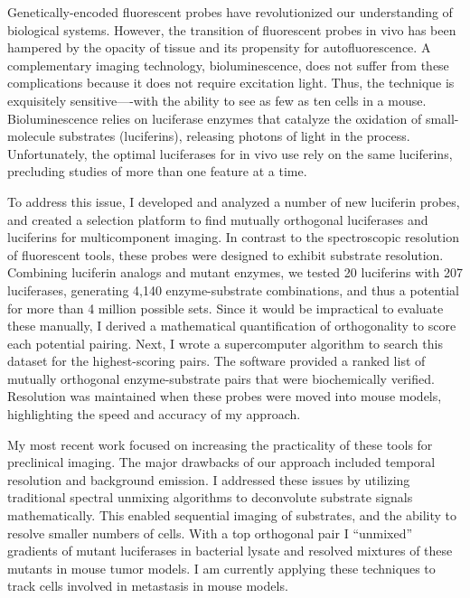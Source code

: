 \thesisabstract
{
Genetically-encoded fluorescent probes have revolutionized our understanding of biological systems. However, the transition of fluorescent probes in vivo has been hampered by the opacity of tissue and its propensity for autofluorescence. A complementary imaging technology, bioluminescence, does not suffer from these complications because it does not require excitation light. Thus, the technique is exquisitely sensitive—-with the ability to see as few as ten cells in a mouse. Bioluminescence relies on luciferase enzymes that catalyze the oxidation of small-molecule substrates (luciferins), releasing photons of light in the process. Unfortunately, the optimal luciferases for in vivo use rely on the same luciferins, precluding studies of more than one feature at a time.

To address this issue, I developed and analyzed a number of new luciferin probes, and created a selection platform to find mutually orthogonal luciferases and luciferins for multicomponent imaging. In contrast to the spectroscopic resolution of fluorescent tools, these probes were designed to exhibit substrate resolution. Combining luciferin analogs and mutant enzymes, we tested 20 luciferins with 207 luciferases, generating 4,140 enzyme-substrate combinations, and thus a potential for more than 4 million possible sets. Since it would be impractical to evaluate these manually, I derived a mathematical quantification of orthogonality to score each potential pairing. Next, I wrote a supercomputer algorithm to search this dataset for the highest-scoring pairs. The software provided a ranked list of mutually orthogonal enzyme-substrate pairs that were biochemically verified. Resolution was maintained when these probes were moved into mouse models, highlighting the speed and accuracy of my approach.

My most recent work focused on increasing the practicality of these tools for preclinical imaging. The major drawbacks of our approach included temporal resolution and background emission. I addressed these issues by utilizing traditional spectral unmixing algorithms to deconvolute substrate signals mathematically. This enabled sequential imaging of substrates, and the ability to resolve smaller numbers of cells. With a top orthogonal pair I ``unmixed'' gradients of mutant luciferases in bacterial lysate and resolved mixtures of these mutants in mouse tumor models. I am currently applying these techniques to track cells involved in metastasis in mouse models.
}


